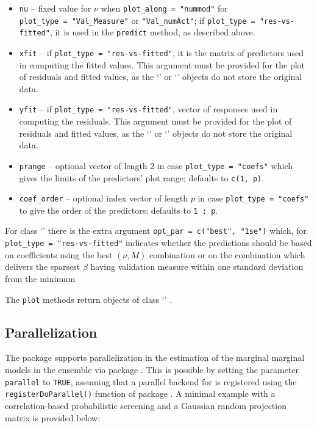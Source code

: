\documentclass[
  article,
  nojss]{jss}
\newcommand{\class}[1]{`\code{#1}'}
\begin{document}
\begin{itemize}
  \texttt{predict} method, as described above.
\item
  \texttt{nu} -- fixed value for \(\nu\) when
  \texttt{plot\_along\ =\ "nummod"} for
  \texttt{plot\_type\ =\ "Val\_Measure"} or \texttt{"Val\_numAct"}; if
  \texttt{plot\_type\ =\ "res-vs-fitted"}, it is used in the
  \texttt{predict} method, as described above.
\item
  \texttt{xfit} -- if \texttt{plot\_type\ =\ "res-vs-fitted"}, it is the
  matrix of predictors used in computing the fitted values. This
  argument must be provided for the plot of residuals and fitted values,
  as the \class{spar} or \class{spar.cv} objects do not store the
  original data.
\item
  \texttt{yfit} -- if \texttt{plot\_type\ =\ "res-vs-fitted"}, vector of
  responses used in computing the residuals. This argument must be
  provided for the plot of residuals and fitted values, as the
  \class{spar} or \class{spar.cv} objects do not store the original
  data.
\item
  \texttt{prange} -- optional vector of length 2 in case
  \texttt{plot\_type\ =\ "coefs"} which gives the limits of the
  predictors' plot range; defaults to \texttt{c(1,\ p)}.
\item
  \texttt{coef\_order} -- optional index vector of length \(p\) in case
  \texttt{plot\_type\ =\ "coefs"} to give the order of the predictors;
  defaults to \texttt{1\ :\ p}.
\end{itemize}

For class \class{spar.cv} there is the extra argument
\texttt{opt\_par\ =\ c("best",\ "1se")} which, for
\texttt{plot\_type\ =\ "res-vs-fitted"} indicates whether the
predictions should be based on coefficients using the best \((\nu, M)\)
combination or on the combination which delivers the sparsest \(\beta\)
having validation measure within one standard deviation from the minimum

The \texttt{plot} methods return objects of class \class{ggplot}
\citep{ggplotR}.

\subsection{Parallelization}\label{parallelization}

The package supports parallelization in the estimation of the marginal
marginal models in the ensemble via package 
\citep{pkg:foreach}. This is possible by setting the parameter
\texttt{parallel} to \texttt{TRUE}, assuming that a parallel backend for
 is registered using the \texttt{registerDoParallel()}
function of package  \citep{pkg:doParallel}. A minimal
example with a correlation-based probabilistic screening and a Gaussian
random projection matrix is provided below:
\end{document}
